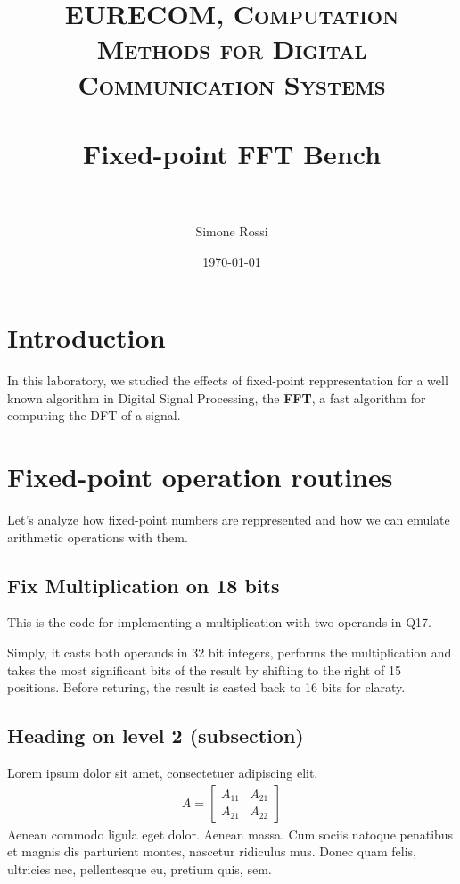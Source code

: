 \documentclass[paper=a4, fontsize=11pt]{scrartcl} %
\title{
\normalfont \normalsize
\textsc{EURECOM, Computation Methods for Digital Communication Systems} \\ [25pt] %
\horrule{0.5pt} \\[0.4cm] %
\huge Fixed-point FFT Bench \\ %
\horrule{2pt} \\[0.5cm] %
}
\author{Simone Rossi} %
\date{\normalsize\today} %
\numberwithin{equation}{section} %
\numberwithin{figure}{section} %
\numberwithin{table}{section} %
\begin{document}
\maketitle %


\section{Introduction}

In this laboratory, we studied the effects of fixed-point reppresentation for a
well known algorithm in Digital Signal Processing, the \textbf{FFT}, a fast algorithm
for computing the DFT of a signal.



\section{Fixed-point operation routines}

Let's analyze how fixed-point numbers are reppresented and how we can emulate
arithmetic operations with them.

\subsection{Fix Multiplication on 18 bits}

This is the code for implementing a multiplication with two operands in Q17.



Simply, it casts both operands in 32 bit integers, performs the multiplication and
takes the most significant bits of the result by shifting to the right of
15 positions. Before returing, the result is casted back to 16 bits for claraty.


\subsection{Heading on level 2 (subsection)}

Lorem ipsum dolor sit amet, consectetuer adipiscing elit.
\begin{align}
A =
\begin{bmatrix}
A_{11} & A_{21} \\
A_{21} & A_{22}
\end{bmatrix}
\end{align}
Aenean commodo ligula eget dolor. Aenean massa. Cum sociis natoque penatibus et magnis dis parturient montes, nascetur ridiculus mus. Donec quam felis, ultricies nec, pellentesque eu, pretium quis, sem.
\end{document}
